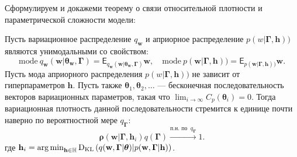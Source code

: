 Сформулируем и докажеми теорему о связи относительной плотности и параметрической сложности модели:
\begin{theorem}
Пусть вариационное распределение $q_\mathbf{w}$ и априорное распределение $p({w}|\boldsymbol{\Gamma}, \mathbf{h}))$ являются унимодальными со свойством:
\[
    \text{mode}~q_{\mathbf{w}}(\mathbf{w}|\boldsymbol{\theta}_\mathbf{w},\boldsymbol{\Gamma}) = \mathsf{E}_{q_{\mathbf{w}}(\mathbf{w}|\boldsymbol{\theta}_\mathbf{w},\boldsymbol{\Gamma})}\mathbf{w},\quad \text{mode}~p(\mathbf{w}|\boldsymbol{\Gamma}, \mathbf{h})) = \mathsf{E}_{p(\mathbf{w}|\boldsymbol{\Gamma}, \mathbf{h}))}\mathbf{w}.
\] 
Пусть мода априорного распределения $p({w}|\boldsymbol{\Gamma}, \mathbf{h}))$ не зависит от гиперпараметров $\mathbf{h}$.
Пусть также $\boldsymbol{\theta}_1,\boldsymbol{\theta}_2,\dots$ --- бесконечная последовательность векторов вариационных параметров, такая что $\lim_{i \to \infty}C_p(\boldsymbol{\theta}_i) = 0.$ 
Тогда вариационная плотность данной последовательности стремится к единице почти наверно по вероятностной мере $q_{\boldsymbol{\Gamma}}$:
\[
    \boldsymbol{\rho}(\mathbf{w}|\boldsymbol{\Gamma}, \mathbf{h}_i)q(\boldsymbol{\Gamma}) \xrightarrow{\text{п.н. по }~q_{\boldsymbol{\Gamma}}} 1.
\]
где $\mathbf{h}_i = \operatorname*{arg\,min}_{\mathbf{h} \in \mathbb{H}} \text{D}_\text{KL}\left(q(\mathbf{w}, \boldsymbol{\Gamma}|\boldsymbol{\theta})|p(\mathbf{w}, \boldsymbol{\Gamma}|\mathbf{h})\right)$. 
\end{theorem}

